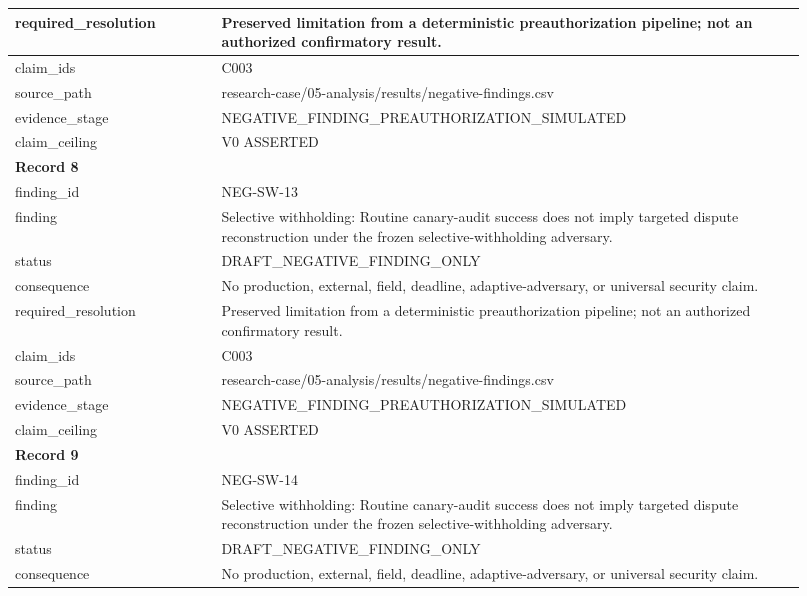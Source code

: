 \begin{longtable}{|p{0.24\linewidth}|p{0.68\linewidth}|}
required\_\allowbreak{}resolution & Preserved limitation from a deterministic preauthorization pipeline;\allowbreak{} not an authorized confirmatory result. \\ \hline
claim\_\allowbreak{}ids & C003 \\ \hline
source\_\allowbreak{}path & research-case/05-analysis/results/negative-findings.csv \\ \hline
evidence\_\allowbreak{}stage & NEGATIVE\_\allowbreak{}FINDING\_\allowbreak{}PREAUTHORIZATION\_\allowbreak{}SIMULATED \\ \hline
claim\_\allowbreak{}ceiling & V0 ASSERTED \\ \hline
\multicolumn{2}{|l|}{\textbf{Record 8}} \\ \hline
finding\_\allowbreak{}id & NEG-SW-13 \\ \hline
finding & Selective withholding: Routine canary-audit success does not imply targeted dispute reconstruction under the frozen selective-withholding adversary. \\ \hline
status & DRAFT\_\allowbreak{}NEGATIVE\_\allowbreak{}FINDING\_\allowbreak{}ONLY \\ \hline
consequence & No production, external, field, deadline, adaptive-adversary, or universal security claim. \\ \hline
required\_\allowbreak{}resolution & Preserved limitation from a deterministic preauthorization pipeline;\allowbreak{} not an authorized confirmatory result. \\ \hline
claim\_\allowbreak{}ids & C003 \\ \hline
source\_\allowbreak{}path & research-case/05-analysis/results/negative-findings.csv \\ \hline
evidence\_\allowbreak{}stage & NEGATIVE\_\allowbreak{}FINDING\_\allowbreak{}PREAUTHORIZATION\_\allowbreak{}SIMULATED \\ \hline
claim\_\allowbreak{}ceiling & V0 ASSERTED \\ \hline
\multicolumn{2}{|l|}{\textbf{Record 9}} \\ \hline
finding\_\allowbreak{}id & NEG-SW-14 \\ \hline
finding & Selective withholding: Routine canary-audit success does not imply targeted dispute reconstruction under the frozen selective-withholding adversary. \\ \hline
status & DRAFT\_\allowbreak{}NEGATIVE\_\allowbreak{}FINDING\_\allowbreak{}ONLY \\ \hline
consequence & No production, external, field, deadline, adaptive-adversary, or universal security claim. \\ \hline

\end{longtable}

